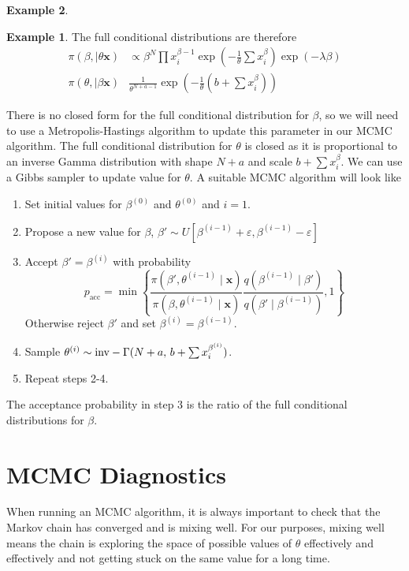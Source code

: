\documentclass[
]{book}
\providecommand{\tightlist}{%
  \setlength{\itemsep}{0pt}\setlength{\parskip}{0pt}}
\theoremstyle{definition}
\theoremstyle{definition}
\newtheorem{example}{Example}[chapter]
\theoremstyle{definition}
\theoremstyle{definition}
\theoremstyle{remark}
\begin{document}
\begin{example}
\begin{example}
The full conditional distributions are therefore
\begin{align*}
\pi(\beta, \mid \theta \boldsymbol{x}) &\propto\beta^N\prod x_i^{\beta - 1}\exp\left(-\frac{1}{\theta}\sum x_i^\beta\right)\exp(-\lambda\beta) \\
\pi(\theta, \mid \beta \boldsymbol{x}) & \frac{1}{\theta^{N + a -1}}\exp\left(-\frac{1}{\theta}(b + \sum x_i^\beta)\right)
\end{align*}

There is no closed form for the full conditional distribution for \(\beta\), so we will need to use a Metropolis-Hastings algorithm to update this parameter in our MCMC algorithm. The full conditional distribution for \(\theta\) is closed as it is proportional to an inverse Gamma distribution with shape \(N + a\) and scale \(b + \sum x_i^\beta\). We can use a Gibbs sampler to update value for \(\theta\). A suitable MCMC algorithm will look like

\begin{enumerate}
\def\labelenumi{\arabic{enumi}.}
\tightlist
\item
  Set initial values for \(\beta^{(0)}\) and \(\theta^{(0)}\) and \(i = 1\).
\item
  Propose a new value for \(\beta\), \(\beta' \sim U[\beta^{(i-1)} + \varepsilon, \beta^{(i-1)} - \varepsilon]\)
\item
  Accept \(\beta' = \beta^{(i)}\) with probability
  \[
  p_{\textrm{acc}} = \min\left\{\frac{\pi(\beta', \theta^{(i-1)} \mid \boldsymbol{x})}{\pi(\beta, \theta^{(i-1)} \mid \boldsymbol{x})}\frac{q(\beta^{(i-1)} \mid \beta')}{q(\beta' \mid \beta^{(i-1)})} , 1\right\}
  \]
  Otherwise reject \(\beta'\) and set \(\beta^{(i)} = \beta^{(i-1)}\).
\item
  Sample \(\theta^{(i)} \sim \hbox{inv}-\Gamma(N + a,\, b + \sum x_i^{\beta^{(i)}})\).
\item
  Repeat steps 2-4.
\end{enumerate}

The acceptance probability in step 3 is the ratio of the full conditional distributions for \(\beta\).
\end{example}

\hypertarget{mcmc-diagnostics}{%
\section{MCMC Diagnostics}\label{mcmc-diagnostics}}

When running an MCMC algorithm, it is always important to check that the Markov chain has converged and is mixing well. For our purposes, mixing well means the chain is exploring the space of possible values of \(\theta\) effectively and effectively and not getting stuck on the same value for a long time.


\end{example}
\end{document}
